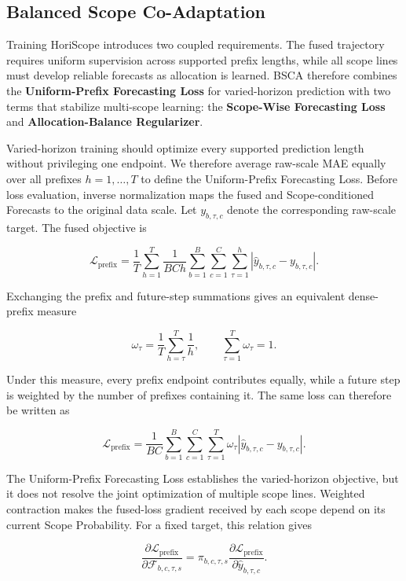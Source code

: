 \subsection{Balanced Scope Co-Adaptation}


Training HoriScope introduces two coupled requirements. The fused trajectory requires uniform supervision across supported prefix lengths, while all scope lines must develop reliable forecasts as allocation is learned. BSCA therefore combines the \textbf{Uniform-Prefix Forecasting Loss} for varied-horizon prediction with two terms that stabilize multi-scope learning: the \textbf{Scope-Wise Forecasting Loss} and \textbf{Allocation-Balance Regularizer}.

Varied-horizon training should optimize every supported prediction length without privileging one endpoint. We therefore average raw-scale MAE equally over all prefixes $h=1,\ldots,T$ to define the Uniform-Prefix Forecasting Loss. Before loss evaluation, inverse normalization maps the fused and Scope-conditioned Forecasts to the original data scale. Let $y_{b,\tau,c}$ denote the corresponding raw-scale target. The fused objective is

\[
\mathcal L_{\mathrm{prefix}}
=
\frac{1}{T}
\sum_{h=1}^{T}
\frac{1}{BCh}
\sum_{b=1}^{B}
\sum_{c=1}^{C}
\sum_{\tau=1}^{h}
\left|
\widehat y_{b,\tau,c}-y_{b,\tau,c}
\right|.
\]


Exchanging the prefix and future-step summations gives an equivalent dense-prefix measure

\[
\omega_\tau
=
\frac{1}{T}
\sum_{h=\tau}^{T}
\frac{1}{h},
\qquad
\sum_{\tau=1}^{T}\omega_\tau=1.
\]


Under this measure, every prefix endpoint contributes equally, while a future step is weighted by the number of prefixes containing it. The same loss can therefore be written as

\[
\mathcal L_{\mathrm{prefix}}
=
\frac{1}{BC}
\sum_{b=1}^{B}
\sum_{c=1}^{C}
\sum_{\tau=1}^{T}
\omega_\tau
\left|
\widehat y_{b,\tau,c}-y_{b,\tau,c}
\right|.
\]


The Uniform-Prefix Forecasting Loss establishes the varied-horizon objective, but it does not resolve the joint optimization of multiple scope lines. Weighted contraction makes the fused-loss gradient received by each scope depend on its current Scope Probability. For a fixed target, this relation gives

\[
\frac{
\partial\mathcal L_{\mathrm{prefix}}
}{
\partial\mathcal F_{b,c,\tau,s}
}
=
\pi_{b,c,\tau,s}
\frac{
\partial\mathcal L_{\mathrm{prefix}}
}{
\partial\widehat y_{b,\tau,c}
}.
\]


